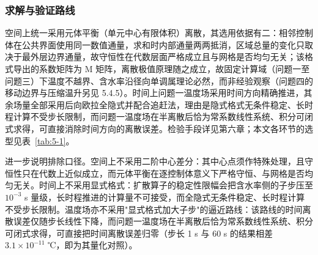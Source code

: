 \subsubsection{求解与验证路线}
空间上统一采用元体平衡（单元中心有限体积）离散，其选用依据有二：相邻控制体在公共界面使用同一数值通量，求和时内部通量两两抵消，区域总量的变化只取决于最外层边界通量，故守恒性在代数层面严格成立且与网格是否均匀无关；该格式导出的系数矩阵为 M 矩阵，离散极值原理随之成立，故固定计算域（问题一至问题三）下温度不越界、含水率沿径向单调属理论必然，而非经验观察（问题四的移动边界与压缩温升另见 5.4.5）。时间上问题一温度场采用时间方向精确推进，其余场量全部采用后向欧拉全隐式并配合追赶法，理由是隐式格式无条件稳定、长时程计算不受步长限制，而问题一温度场在半离散后恰为常系数线性系统、积分可闭式求得，可直接消除时间方向的离散误差。检验手段详见第六章；本文各环节的选型见表~\ref{tab:5-1}。

进一步说明排除口径。空间上不采用二阶中心差分：其中心点须作特殊处理，且守恒性只在代数上近似成立，而元体平衡在逐控制体意义下严格守恒、与网格是否均匀无关。时间上不采用显式格式：扩散算子的稳定性限幅会把含水率侧的子步压至 $10^{-3}$ s 量级，长时程推进的计算量不可接受，而全隐式无条件稳定、长时程计算不受步长限制。温度场亦不采用"显式格式加大子步"的逼近路线：该路线的时间离散误差仅随步长线性下降，而问题一温度场在半离散后恰为常系数线性系统、积分可闭式求得，可直接把时间离散误差归零（步长 1 s 与 60 s 的结果相差 $3.1\times10^{-11}$ ℃，即为其量化对照）。




